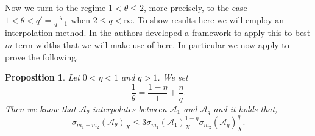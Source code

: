 \documentclass[11pt,reqno]{article}
\numberwithin{equation}{section}
\theoremstyle{definition}
\theoremstyle{plain}
\newtheorem{prop}[satz]{Proposition}
\newcommand{\ca}{\ensuremath{\mathcal A}}
\begin{document}
  Now we turn to the regime \(1<\theta\le 2\), more precisely, to the case
 \(1< \theta<q'=\frac{q}{q-1}\) when \(2\le q<\infty\).
  To show results here we will employ an interpolation method. In \cite{TeUl22} the authors developed a framework to apply this to best \(m\)-term widths that we will make use of here. In particular we now apply {\cite[Theorem 3.3]{TeUl22}} to prove the following.
\begin{prop}\label{interpol_sigma}
    Let \(0 < \eta < 1\) and \(q > 1\). We set
    \begin{equation}
        \frac{1}{\theta} = \frac{1 - \eta}{1} + \frac{\eta}{q}.
    \end{equation}
    Then we know that \(\ca_\theta\) interpolates between \(\ca_1\) and \(\ca_q\) and it holds that,
    \begin{equation}
        \sigma_{m_1 + m_2}(\ca_\theta)_X \leq 3 \sigma_{m_1}(\ca_1)^{1-\eta}_X \sigma_{m_2}(\ca_q)^\eta_X. 
    \end{equation}
\end{prop}
\end{document}
